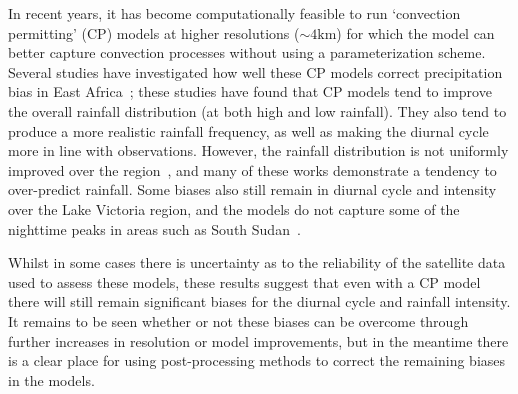 \documentclass{article}
\begin{document}
In recent years, it has become computationally feasible to run `convection permitting' (CP) models at higher resolutions ($\sim4\text{km}$) for which the model can better capture convection processes without using a parameterization scheme. Several studies have investigated how well these CP models correct precipitation bias in East Africa~\citep{finney_implications_2019, cafaro_convection-permitting_2021, woodhams_what_2018, chamberlain_forecasting_2014, kendon_enhanced_2019, senior_convection-permitting_2021}; these studies have found that CP models tend to improve the overall rainfall distribution (at both high and low rainfall). They also tend to produce a more realistic rainfall frequency, as well as making the diurnal cycle more in line with observations. However, the rainfall distribution is not uniformly improved over the region~\citep{senior_convection-permitting_2021}, and many of these works demonstrate a tendency to over-predict rainfall. Some biases also still remain in diurnal cycle and intensity over the Lake Victoria region, and the models do not capture some of the nighttime peaks in areas such as South Sudan~\citep{finney_implications_2019, chamberlain_forecasting_2014}. 

Whilst in some cases there is uncertainty as to the reliability of the satellite data used to assess these models, these results suggest that even with a CP model there will still remain significant biases for the diurnal cycle and rainfall intensity. It remains to be seen whether or not these biases can be overcome through further increases in resolution or model improvements, but in the meantime there is a clear place for using post-processing methods to correct the remaining biases in the models.



\end{document}
